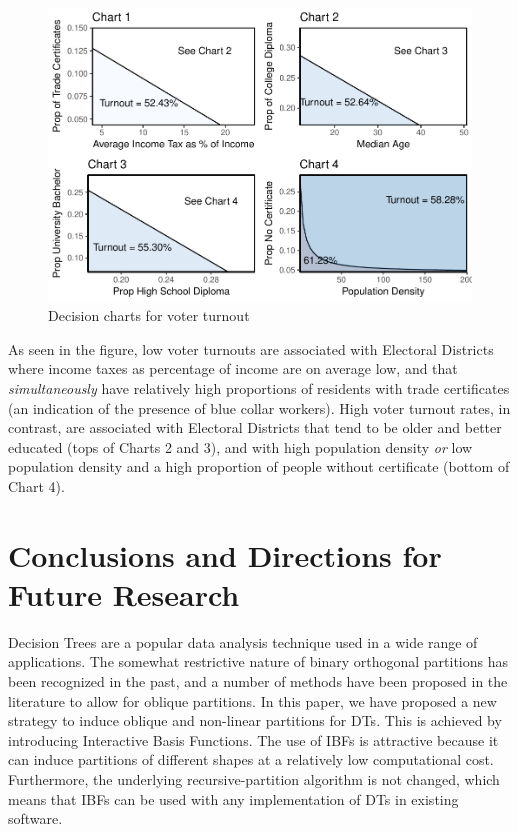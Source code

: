 \documentclass[]{elsarticle} %
\makeatletter
\def\maxwidth{\ifdim\Gin@nat@width>\linewidth\linewidth
\else\Gin@nat@width\fi}
\let\Oldincludegraphics\includegraphics
\renewcommand{\includegraphics}[1]{\Oldincludegraphics[width=\maxwidth]{#1}}
\makeatother
\begin{document}
\begin{figure}[htbp]
\centering
\includegraphics{Trees_with_Base_Functions_files/figure-latex/fig23-election-decision-charts-1.pdf}
\caption{\label{fig23-election-decision-charts}Decision charts for voter
turnout}
\end{figure}

As seen in the figure, low voter turnouts are associated with Electoral
Districts where income taxes as percentage of income are on average low,
and that \emph{simultaneously} have relatively high proportions of
residents with trade certificates (an indication of the presence of blue
collar workers). High voter turnout rates, in contrast, are associated
with Electoral Districts that tend to be older and better educated (tops
of Charts 2 and 3), and with high population density \emph{or} low
population density and a high proportion of people without certificate
(bottom of Chart 4).

\hypertarget{conclusions-and-directions-for-future-research}{\section{Conclusions
and Directions for Future
Research}\label{conclusions-and-directions-for-future-research}}

Decision Trees are a popular data analysis technique used in a wide
range of applications. The somewhat restrictive nature of binary
orthogonal partitions has been recognized in the past, and a number of
methods have been proposed in the literature to allow for oblique
partitions. In this paper, we have proposed a new strategy to induce
oblique and non-linear partitions for DTs. This is achieved by
introducing Interactive Basis Functions. The use of IBFs is attractive
because it can induce partitions of different shapes at a relatively low
computational cost. Furthermore, the underlying recursive-partition
algorithm is not changed, which means that IBFs can be used with any
implementation of DTs in existing software.
\end{document}
